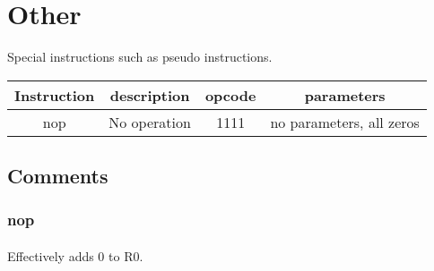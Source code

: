 \documentclass[a4paper]{article}
\begin{document}
\section{Other}
Special instructions such as pseudo instructions.

\begin{center}
\begin{tabular}{| c | c | c | c |}
\hline
Instruction & description & opcode & parameters \\ \hline
nop & No operation & 1111 & no parameters, all zeros\\ \hline
\end{tabular}
\end{center}

\subsection{Comments}
\subsubsection{nop}
\paragraph{}Effectively adds 0 to R0.
\end{document}
